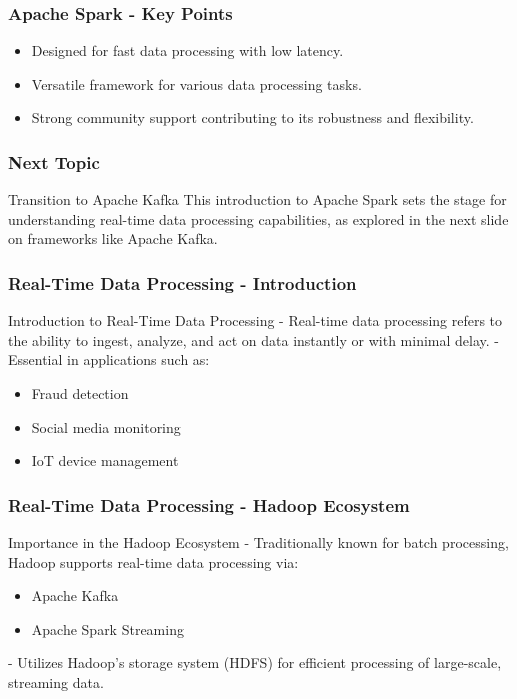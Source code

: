 \documentclass[aspectratio=169]{beamer}
\begin{document}
\begin{frame}[fragile]
    \frametitle{Apache Spark - Key Points}
    \begin{itemize}
        \item Designed for fast data processing with low latency.
        \item Versatile framework for various data processing tasks.
        \item Strong community support contributing to its robustness and flexibility.
    \end{itemize}
\end{frame}

\begin{frame}[fragile]
    \frametitle{Next Topic}
    \begin{block}{Transition to Apache Kafka}
        This introduction to Apache Spark sets the stage for understanding real-time data processing capabilities, as explored in the next slide on frameworks like Apache Kafka.
    \end{block}
\end{frame}

\begin{frame}[fragile]
    \frametitle{Real-Time Data Processing - Introduction}
    \begin{block}{Introduction to Real-Time Data Processing}
        - Real-time data processing refers to the ability to ingest, analyze, and act on data instantly or with minimal delay.
        - Essential in applications such as:
        \begin{itemize}
            \item Fraud detection
            \item Social media monitoring
            \item IoT device management
        \end{itemize}
    \end{block}
\end{frame}

\begin{frame}[fragile]
    \frametitle{Real-Time Data Processing - Hadoop Ecosystem}
    \begin{block}{Importance in the Hadoop Ecosystem}
        - Traditionally known for batch processing, Hadoop supports real-time data processing via:
        \begin{itemize}
            \item Apache Kafka
            \item Apache Spark Streaming
        \end{itemize}
        - Utilizes Hadoop's storage system (HDFS) for efficient processing of large-scale, streaming data.
    \end{block}
\end{frame}
\end{document}
